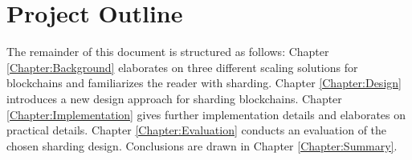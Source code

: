\section{Project Outline}

The remainder of this document is structured as follows: Chapter \ref{Chapter:Background} elaborates on three different scaling solutions for blockchains and familiarizes the reader with sharding. Chapter \ref{Chapter:Design} introduces a new design approach for sharding blockchains. Chapter \ref{Chapter:Implementation} gives further implementation details and elaborates on practical details. Chapter \ref{Chapter:Evaluation} conducts an evaluation of the chosen sharding design. Conclusions are drawn in Chapter \ref{Chapter:Summary}.
